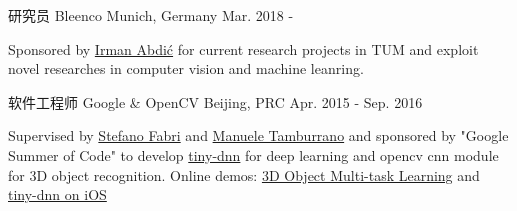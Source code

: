 


\begin{cventries}


\cventry
{研究员} %
{Bleenco} %
{Munich, Germany} %
{Mar. 2018 - } %
{ %
\begin{cvitems}
\item {Sponsored by \href{https://www.linkedin.com/in/irmanabdic/?originalSubdomain=de}{Irman Abdić} for current research projects in TUM and exploit novel researches in computer vision and machine leanring.}
\end{cvitems}
}

\cventry
{软件工程师} %
{Google \& OpenCV} %
{Beijing, PRC} %
{Apr. 2015 - Sep. 2016} %
{ %
\begin{cvitems}
\item {Supervised by \href{https://www.linkedin.com/in/stefano-fabri-16a73748}{Stefano Fabri} and \href{https://www.linkedin.com/in/manuele-tamburrano-b82384a5?authType=name&authToken=Di5p&trk=prof-sb-browse_map-name}{Manuele Tamburrano} and sponsored by "Google Summer of Code" to develop \href{https://github.com/tiny-dnn/tiny-dnn}{tiny-dnn} for deep learning and opencv cnn module for 3D object recognition.
Online demos: \href{https://www.youtube.com/watch?v=Mc20rTYdXTE}{3D Object Multi-task Learning} and \href{https://drive.google.com/open?id=0B-RYa1FDOrYXVUEzcG1mdnl5a3M}{tiny-dnn on iOS}
}
\end{cvitems}
}


\end{cventries}

